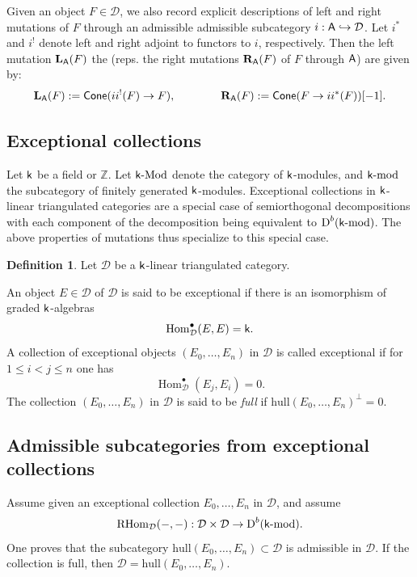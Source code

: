 \documentclass[sn-mathphys-num]{sn-jnl}%
\newcommand{\D}{\mathcal D}
\newcommand{\subsetq}{\subset}
\newcommand{\hull}{{\mathrm{hull}}}
\newcommand*{\Dd}{\mathop{\mathrm D\kern0pt}\nolimits}
\newcommand*{\Hom}{\mathop{\mathrm {Hom}}\nolimits}
\newcommand*{\RHom}{\mathop{\mathrm {RHom}}\nolimits}
\newcommand{\A}{{\sf A}}
\newcommand{\sk}{{\sf k}}
\newcommand{\Z}{{\mathbb Z}}
\newcommand{\kmod}{\sk\textrm{-}\mathrm{mod}}
\newcommand{\kMod}{\sk\textrm{-}\mathrm{Mod}}
\theoremstyle{definition}
\newtheorem{definition}[theorem]{Definition}%
\begin{document}
Given an object $F \in \D$, we also record explicit descriptions of 
left and right mutations of $F$ through an admissible admissible subcategory $i:\A\hookrightarrow \D$. Let $i^{\ast}$ and $i^{!}$ denote left and right adjoint to functors to $i$, respectively. Then the left mutation ${\bf L}_{\A}(F)$ the (reps. the right mutations ${\bf R}_{\A}(F)$ of $F$ through $\A$) are given by: 
\begin{equation}\label{eq:left-right_mutations_of_an_object}
{\bf L}_{\A}(F): = {\sf Cone}(ii^{!}(F)\rightarrow F), \qquad \qquad {\bf R}_{\A}(F): = {\sf Cone}(F\rightarrow ii^{\ast}(F))[-1].
\end{equation}


\subsection{Exceptional collections}\label{subsec:FEC}

Let $\sk$ be a field or $\Z$. Let $\kMod$ denote the category of $\sk$-modules, and $\kmod$ the subcategory of finitely generated $\sk$-modules.
Exceptional collections in $\sf k$-linear triangulated categories are a special case of semiorthogonal decompositions with each component of the decomposition being equivalent to $\Dd ^b({\kmod})$. The above properties of mutations thus specialize to this special case.

\begin{definition}\label{def:exceptcollection}Let $\D$ be a $\sf k$-linear triangulated category.

An object $E \in \D$ of  $\D$ is said to be exceptional if there is an isomorphism of graded $\sf k$-algebras 
\begin{equation}
\Hom _{\D}^{\bullet}(E,E) = {\sf k}.
\end{equation}
A collection of exceptional objects $(E_0,\dots,E_n)$ in $\D$ is called 
exceptional if for $1 \leq i < j \leq n$ one has
\begin{equation}
\Hom _{\D}^{\bullet}(E_j,E_i) = 0.
\end{equation}
The collection $(E_0,\dots,E_n)$ in $\D$ is said to be {\it full} if 
$\hull(E_0,\dots,E_n)^{\perp} = 0.$
\end{definition}
\subsection{Admissible subcategories from exceptional collections}
Assume given an exceptional collection $E_0,\dots,E_n$ in  $\D$, and assume  $$\RHom_\D(-,-):\D\times \D\to \Dd^b(\kmod).$$
One proves \cite[Theorem 3.2]{Bondal} that the subcategory $\hull(E_0,\dots,E_n)\subsetq \D$ is admissible in $\D$.
If the collection is full, then ${\D}
= \hull(E_0,\dots,E_n)$.
\end{document}
